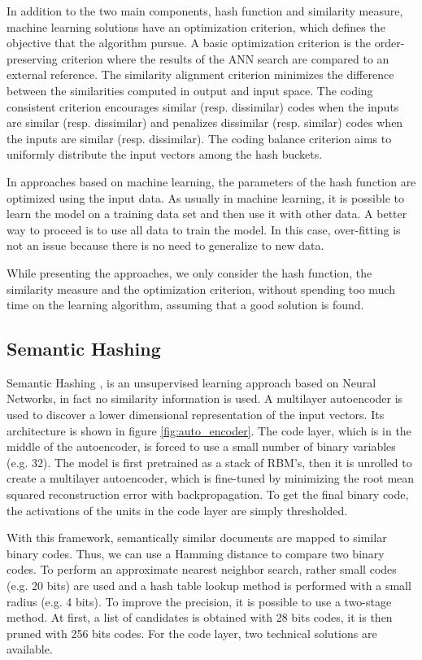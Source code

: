 In addition to the two main components, hash function and similarity measure, machine learning solutions have an optimization criterion, which defines the objective that the algorithm pursue. A basic optimization criterion is the order-preserving criterion where the results of the ANN search are compared to an external reference. The similarity alignment criterion minimizes the difference between the similarities computed in output and input space. The coding consistent criterion encourages similar (resp. dissimilar) codes when the inputs are similar (resp. dissimilar) and penalizes dissimilar (resp. similar) codes when the inputs are similar (resp. dissimilar). The coding balance criterion aims to uniformly distribute the input vectors among the hash buckets.

In approaches based on machine learning, the parameters of the hash function are optimized using the input data. As usually in machine learning, it is possible to learn the model on a training data set and then use it with other data. A better way to proceed is to use all data to train the model. In this case, over-fitting is not an issue because there is no need to generalize to new data.

While presenting the approaches, we only consider the hash function, the similarity measure and the optimization criterion, without spending too much time on the learning algorithm, assuming that a good solution is found.

\subsection{Semantic Hashing}
Semantic Hashing \cite{salakhutdinov2007semantic},\cite{salakhutdinov2009semantic} is an unsupervised learning approach based on Neural Networks, in fact no similarity information is used. A multilayer autoencoder is used to discover a lower dimensional representation of the input vectors. Its architecture is shown in figure \ref{fig:auto_encoder}. The code layer, which is in the middle of the autoencoder, is forced to use a small number of binary variables (e.g. 32). The model is first pretrained as a stack of RBM's, then it is unrolled to create a multilayer autoencoder, which is fine-tuned by minimizing the root mean squared reconstruction error with backpropagation. To get the final binary code, the activations of the units in the code layer are simply thresholded.

With this framework, semantically similar documents are mapped to similar binary codes. Thus, we can use a Hamming distance to compare two binary codes. To perform an approximate nearest neighbor search, rather small codes (e.g. 20 bits) are used and a hash table lookup method is performed with a small radius (e.g. 4 bits). To improve the precision, it is possible to use a two-stage method. At first, a list of candidates is obtained with 28 bits codes, it is then pruned with 256 bits codes. For the code layer, two technical solutions are available.

